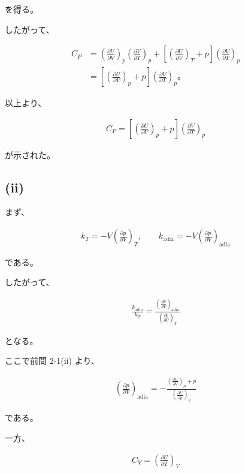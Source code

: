 \documentclass[platex,dvipdfmx,a4paper]{jsarticle}
\begin{document}
を得る。

したがって、

\begin{align*}
C_P
&=
\left(\frac{\partial U}{\partial V}\right)_p
\left(\frac{\partial V}{\partial T}\right)_p
+
\left[
\left(\frac{\partial U}{\partial V}\right)_T+p
\right]
\left(\frac{\partial V}{\partial T}\right)_p \\
&=
\left[
\left(\frac{\partial U}{\partial V}\right)_p+p
\right]
\left(\frac{\partial V}{\partial T}\right)_p。
\end{align*}

以上より、

\begin{align*}
C_P
=
\left[
\left(\frac{\partial U}{\partial V}\right)_p+p
\right]
\left(\frac{\partial V}{\partial T}\right)_p
\end{align*}

が示された。

\subsection{(ii)}

まず、

\begin{align*}
k_T
=
-
V
\left(\frac{\partial p}{\partial V}\right)_T,
\qquad
k_{\mathrm{adia}}
=
-
V
\left(\frac{\partial p}{\partial V}\right)_{\mathrm{adia}}
\end{align*}

である。

したがって、

\begin{align*}
\frac{k_{\mathrm{adia}}}{k_T}
=
\frac{
\left(\frac{\partial p}{\partial V}\right)_{\mathrm{adia}}
}{
\left(\frac{\partial p}{\partial V}\right)_T
}
\end{align*}

となる。

ここで前問 2-1(ii) より、

\begin{align*}
\left(\frac{\partial p}{\partial V}\right)_{\mathrm{adia}}
=
-
\frac{
\left(\frac{\partial U}{\partial V}\right)_p+p
}{
\left(\frac{\partial U}{\partial p}\right)_V
}
\end{align*}

である。

一方、

\begin{align*}
C_V
=
\left(\frac{\partial U}{\partial T}\right)_V
\end{align*}
\end{document}
